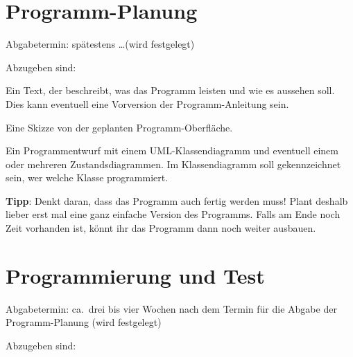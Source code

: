 \section{Programm-Planung}

Abgabetermin:       spätestens \ldots (wird festgelegt)

Abzugeben sind:

\begin{compactitem}
\item Ein Text, der beschreibt, was das Programm leisten und wie es aussehen
soll. Dies kann eventuell eine Vorversion der Programm-Anleitung sein.

\item Eine Skizze von der geplanten Programm-Oberfläche.

\item Ein Programmentwurf mit einem UML-Klassendiagramm und eventuell einem oder
mehreren Zustandsdiagrammen. Im Klassendiagramm soll gekennzeichnet sein, wer
welche Klasse programmiert.
\end{compactitem}

\textbf{Tipp}: Denkt daran, dass das Programm auch fertig werden muss! Plant
deshalb lieber erst mal eine ganz einfache Version des Programms. Falls am Ende
noch Zeit vorhanden ist, könnt ihr das Programm dann noch weiter ausbauen.


\section{Programmierung und Test}

Abgabetermin: ca.\ drei bis vier Wochen nach dem Termin für die Abgabe der
Programm-Planung (wird festgelegt)

Abzugeben sind:

